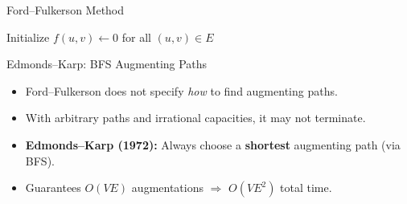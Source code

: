 \documentclass[aspectratio=169]{beamer}
\begin{document}
\begin{frame}{Ford--Fulkerson Method}
  \begin{algorithm}[H]
    \SetAlgoLined
    Initialize $f(u,v) \leftarrow 0$ for all $(u,v) \in E$\;
    \;
  \end{algorithm}
\end{frame}

\begin{frame}{Edmonds--Karp: BFS Augmenting Paths}
  \begin{itemize}
    \item Ford--Fulkerson does not specify \emph{how} to find augmenting paths.
    \item With arbitrary paths and irrational capacities, it may not terminate.
    \item \textbf{Edmonds--Karp (1972):} Always choose a \textbf{shortest}
          augmenting path (via BFS).
    \item Guarantees $O(VE)$ augmentations $\Rightarrow$ $O(VE^2)$ total time.
  \end{itemize}
\end{frame}
\end{document}
